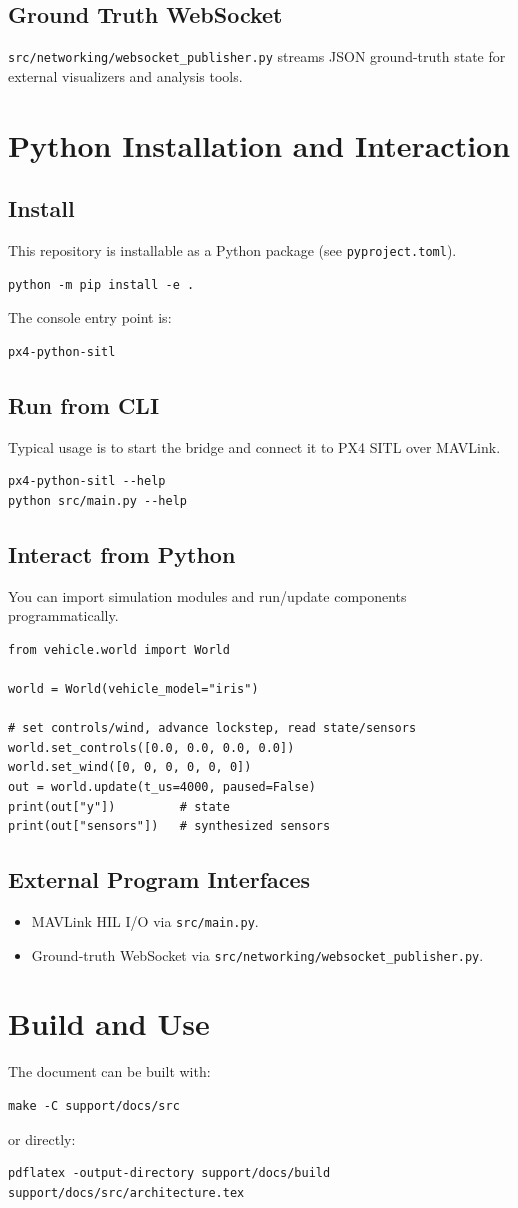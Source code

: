\documentclass[11pt,a4paper]{article}
\begin{document}
\subsection{Ground Truth WebSocket}
\texttt{src/networking/websocket_publisher.py} streams JSON ground-truth state for external visualizers and analysis tools.

\section{Python Installation and Interaction}
\subsection{Install}
This repository is installable as a Python package (see \texttt{pyproject.toml}).
\begin{verbatim}
python -m pip install -e .
\end{verbatim}
The console entry point is:
\begin{verbatim}
px4-python-sitl
\end{verbatim}

\subsection{Run from CLI}
Typical usage is to start the bridge and connect it to PX4 SITL over MAVLink.
\begin{verbatim}
px4-python-sitl --help
python src/main.py --help
\end{verbatim}
\subsection{Interact from Python}
You can import simulation modules and run/update components programmatically.
\begin{verbatim}
from vehicle.world import World

world = World(vehicle_model="iris")

# set controls/wind, advance lockstep, read state/sensors
world.set_controls([0.0, 0.0, 0.0, 0.0])
world.set_wind([0, 0, 0, 0, 0, 0])
out = world.update(t_us=4000, paused=False)
print(out["y"])         # state
print(out["sensors"])   # synthesized sensors
\end{verbatim}

\subsection{External Program Interfaces}
\begin{itemize}
    \item MAVLink HIL I/O via \texttt{src/main.py}.
    \item Ground-truth WebSocket via \texttt{src/networking/websocket_publisher.py}.
\end{itemize}

\section{Build and Use}
The document can be built with:
\begin{verbatim}
make -C support/docs/src
\end{verbatim}
or directly:
\begin{verbatim}
pdflatex -output-directory support/docs/build support/docs/src/architecture.tex
\end{verbatim}
\end{document}

